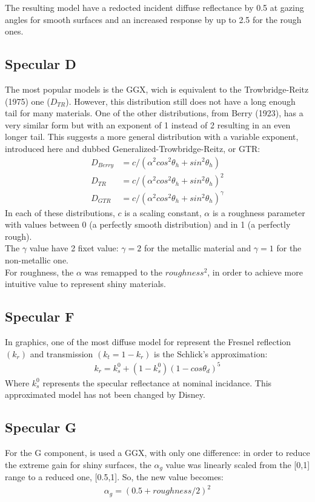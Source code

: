 \documentclass[11pt]{article}
\begin{document}
The resulting model have a redocted incident diffuse reflectance by 0.5 at gazing angles for smooth surfaces and an increased response by up to 2.5 for the rough ones.
\subsection{Specular D}
The most popular models is the GGX, wich is equivalent to the Trowbridge-Reitz (1975) one ($D_{TR}$). 
However, this distribution still does not have a long enough tail for many materials.
One of the other distributions, from Berry (1923), has a very similar
form but with an exponent of 1 instead of 2 resulting in an even longer tail. This suggests a more general
distribution with a variable exponent, introduced here and dubbed Generalized-Trowbridge-Reitz, or
GTR:
\begin{align*}
  D_{Berry} &= c/(\alpha^2 cos^2\theta_h + sin^2\theta_h) \\
  D_{TR} &= c/(\alpha^2 cos^2\theta_h + sin^2\theta_h)^2 \\
  D_{GTR} &= c/(\alpha^2 cos^2\theta_h + sin^2\theta_h)^\gamma
\end{align*}
 In each of these distributions, $\textit{c}$ is a scaling constant, $\alpha$ is a roughness parameter with values between 0 (a perfectly smooth distribution) and in 1 (a perfectly rough).\\
The $\gamma$ value have 2 fixet value: $\gamma = 2$ for the metallic material and $\gamma = 1$ for the non-metallic one.\\
For roughness, the $\alpha$ was remapped to the $roughness^2$, in order to achieve more intuitive value to represent shiny materials.

\subsection{Specular F}
In graphics, one of the most diffuse model for represent the Fresnel reflection $ (k_r) $ and transmission $ (k_t = 1 - k_r) $ is the Schlick's approximation:
\begin{align*}
	k_r = k_s^0 + (1 - k_s^0)(1 - cos\theta_d)^5
\end{align*}
Where $k_s^0$ represents the specular reflectance at nominal incidance.
This approximated model has not been changed by Disney.
\subsection{Specular G}
For the G component, is used a GGX, with only one difference: in order to reduce the
extreme gain for shiny surfaces, the $\alpha_g$ value was linearly scaled from the [0,1] range to a reduced one, [0.5,1].
So, the new value becomes:
\begin{align*}
	\alpha_g = (0.5 + roughness/2)^2
\end{align*}
\end{document}
